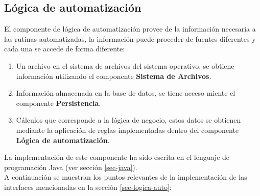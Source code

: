 \subsection{Lógica de automatización}
El componente de lógica de automatización provee de la información necesaria a las rutinas automatizadas, la información puede proceder de fuentes diferentes y cada una se accede de forma diferente:
\begin{enumerate}
 	\item Un archivo en el sistema de archivos del sistema operativo, se obtiene información utilizando el componente \textbf{Sistema de Archivos}.
 	\item Información almacenada en la base de datos, se tiene acceso miente el componente \textbf{Persistencia}.
 	\item Cálculos que corresponde a la lógica de negocio, estos datos se obtienen mediante la aplicación de reglas implementadas dentro del componente \textbf{Lógica de automatización}.
\end{enumerate}
La implementación de este componente ha sido escrita en el lenguaje de programación Java (ver sección \ref{sec-java}).\\
A continuación se muestran los puntos relevantes de la implementación de las interfaces mencionadas en la sección \ref{sec-logica-auto}:
